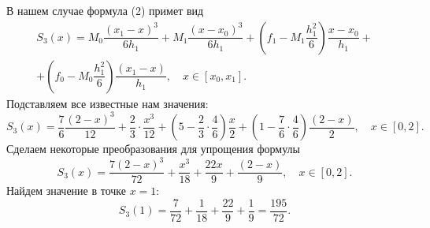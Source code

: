 \documentclass[a4paper, 12pt]{article}
\begin{document}
\begin{enumerate}
	В нашем случае формула (2) примет вид \begin{multline*}
		S_3(x) = M_0\dfrac{(x_1 - x)^3}{6h_1} + M_{1}\dfrac{(x-x_0)^3}{6h_1} + \left(f_1 - M_1\dfrac{h_1^2}{6}\right)\dfrac{x-x_0}{h_1} +\\+ \left(f_0 - M_0\dfrac{h_1^2}{6}\right)\dfrac{(x_1 - x)}{h_1},\quad x\in [x_0, x_1].
	\end{multline*}
	Подставляем все известные нам значения:
	$$
	S_3(x) = \dfrac76\dfrac{(2 - x)^3}{12} + \dfrac23\cdot\dfrac{x^3}{12} + \left(5 - \dfrac23\cdot\dfrac{4}{6}\right)\dfrac{x}{2} + \left(1 - \dfrac76\cdot\dfrac{4}{6}\right)\dfrac{(2 - x)}{2},\quad x\in [0, 2].
	$$
	Сделаем некоторые преобразования для упрощения формулы
	$$
	S_3(x) = \dfrac{7(2 - x)^3}{72} + \dfrac{x^3}{18} + \dfrac{22x}{9} + \dfrac{(2 - x)}{9},\quad x\in [0, 2].
	$$
	Найдем значение в точке $x=1$:
	$$
	S_3(1) = \dfrac{7}{72} + \dfrac{1}{18} + \dfrac{22}{9} + \dfrac{1}{9} = \dfrac{195}{72}.
	$$
	\end{enumerate}
\end{document}
